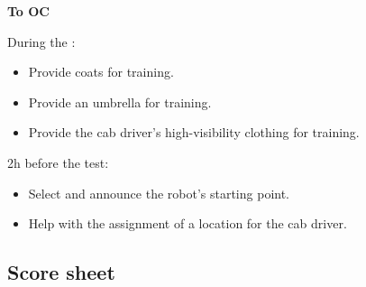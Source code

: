 \textbf{To OC}

During the \SetupDays:
\begin{itemize}
	\item Provide coats for training.
	\item Provide an umbrella for training.
	\item Provide the cab driver's high-visibility clothing for training.
\end{itemize}

2h before the test:
\begin{itemize}
	\item Select and announce the robot's starting point.
	\item Help with the assignment of a location for the cab driver.
\end{itemize}

\subsection*{Score sheet}


